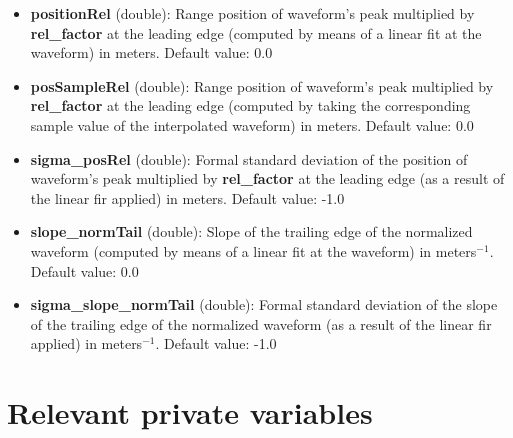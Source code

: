 \begin{itemize}
\item {\bf positionRel} (double): Range position of waveform's peak multiplied by {\bf rel\_factor} at the leading edge (computed by means of a linear fit at the waveform) in meters. Default value: 0.0

\item {\bf posSampleRel} (double): Range position of waveform's peak multiplied by {\bf rel\_factor} at the leading edge (computed by taking the corresponding sample value of the interpolated waveform) in meters. Default value: 0.0

\item {\bf sigma\_posRel} (double): Formal standard deviation of the position of waveform's peak multiplied by {\bf rel\_factor} at the leading edge (as a result of the linear fir applied) in meters. Default value: -1.0

\item {\bf slope\_normTail} (double): Slope of the trailing edge of the normalized waveform (computed by means of a linear fit at the waveform) in meters$^{-1}$. Default value: 0.0

\item {\bf sigma\_slope\_normTail} (double): Formal standard deviation of the slope of the trailing edge of the normalized waveform (as a result of the linear fir applied) in meters$^{-1}$. Default value: -1.0
\end{itemize}

\section{Relevant private variables}

